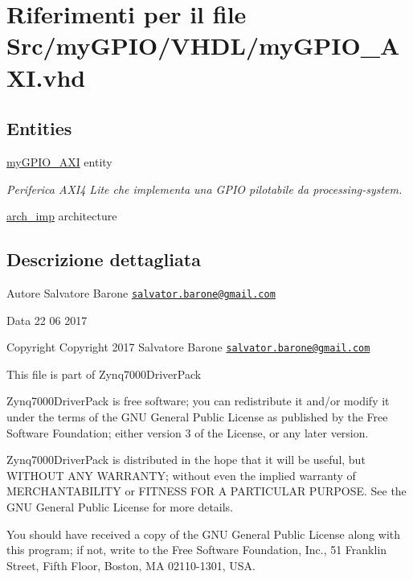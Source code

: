 \hypertarget{my_g_p_i_o___a_x_i_8vhd}{\section{Riferimenti per il file Src/my\+G\+P\+I\+O/\+V\+H\+D\+L/my\+G\+P\+I\+O\+\_\+\+A\+X\+I.vhd}
\label{my_g_p_i_o___a_x_i_8vhd}
}
\subsection*{Entities}
\begin{DoxyCompactItemize}
\item 
\hyperlink{classmy_g_p_i_o___a_x_i}{my\+G\+P\+I\+O\+\_\+\+A\+X\+I} entity
\begin{DoxyCompactList}\small\item\em Periferica A\+X\+I4 Lite che implementa una G\+P\+I\+O pilotabile da processing-\/system. \end{DoxyCompactList}\item 
\hyperlink{classmy_g_p_i_o___a_x_i_1_1arch__imp}{arch\+\_\+imp} architecture
\end{DoxyCompactItemize}


\subsection{Descrizione dettagliata}
\begin{DoxyAuthor}{Autore}
Salvatore Barone \href{mailto:salvator.barone@gmail.com}{\tt salvator.\+barone@gmail.\+com} 
\end{DoxyAuthor}
\begin{DoxyDate}{Data}
22 06 2017
\end{DoxyDate}
\begin{DoxyCopyright}{Copyright}
Copyright 2017 Salvatore Barone \href{mailto:salvator.barone@gmail.com}{\tt salvator.\+barone@gmail.\+com}
\end{DoxyCopyright}
This file is part of Zynq7000\+Driver\+Pack

Zynq7000\+Driver\+Pack is free software; you can redistribute it and/or modify it under the terms of the G\+N\+U General Public License as published by the Free Software Foundation; either version 3 of the License, or any later version.

Zynq7000\+Driver\+Pack is distributed in the hope that it will be useful, but W\+I\+T\+H\+O\+U\+T A\+N\+Y W\+A\+R\+R\+A\+N\+T\+Y; without even the implied warranty of M\+E\+R\+C\+H\+A\+N\+T\+A\+B\+I\+L\+I\+T\+Y or F\+I\+T\+N\+E\+S\+S F\+O\+R A P\+A\+R\+T\+I\+C\+U\+L\+A\+R P\+U\+R\+P\+O\+S\+E. See the G\+N\+U General Public License for more details.

You should have received a copy of the G\+N\+U General Public License along with this program; if not, write to the Free Software Foundation, Inc., 51 Franklin Street, Fifth Floor, Boston, M\+A 02110-\/1301, U\+S\+A. 
